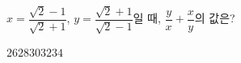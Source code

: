 $x=\dfrac{\sqrt{2}-1}{\sqrt{2}+1}$, $y=\dfrac{\sqrt{2}+1}{\sqrt{2}-1}$일 때, $\dfrac{y}{x}+\dfrac{x}{y}$의 값은?
\begin{choices32}{$26$}{$28$}{$30$}{$32$}{$34$}\end{choices32}
